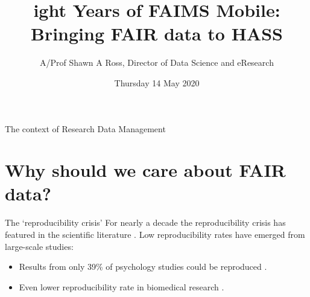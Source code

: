 \documentclass[aspectratio=169, 11pt]{beamer} %
\title{ight Years of FAIMS Mobile: Bringing FAIR data to HASS} %
\author{A/Prof Shawn A Ross, Director of Data Science and eResearch}               %
\institute{Office of the Deputy Vice-Chancellor (Research)}         %
\date{Thursday 14 May 2020}                 %
\begin{document}

\maketitle

  

\begin{frame}{The context of Research Data Management}
  \tableofcontents
\end{frame}

%



\section{Why should we care about FAIR data?}

\begin{frame}{The `reproducibility crisis'}
  For nearly a decade the reproducibility crisis has featured in the scientific literature \cite{Jasny2011-bw, Baker2016-cf, Munafo2017-bj}. Low reproducibility rates have emerged from large-scale studies:
    \begin{itemize}[label=\textbullet]
        \item Results from only 39\% of psychology studies could be reproduced \cite{Open_Science_Collaboration2015-vf}.
        \item Even lower reproducibility rate in biomedical research \cite{Begley2012-xt,Prinz2011-za}.
    \end{itemize}
\end{frame}
\end{document}
